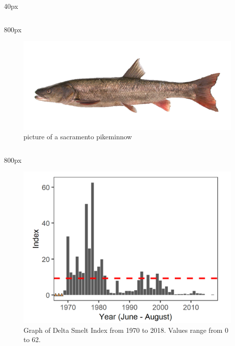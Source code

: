 \documentclass[
]{book}
\begin{document}
\begin{column}{40px\textwidth}
~
\end{column}

\begin{column}{800px\textwidth}
\begin{figure}

{\centering \includegraphics[width=29.17in]{figures/sacramento_pikeminnow} 

}

\caption{picture of a sacramento pikeminnow}\label{fig:unnamed-chunk-78}
\end{figure}
\end{column}

\begin{column}{800px\textwidth}
\begin{figure}
\includegraphics[width=15.25in]{figures/STN_DSM} \caption{Graph of Delta Smelt Index from 1970 to 2018. Values range from 0 to 62.}\label{fig:unnamed-chunk-79}
\end{figure}
\end{column}
\end{document}
